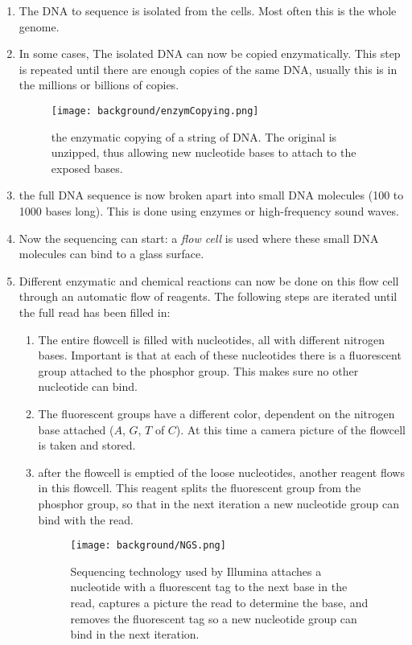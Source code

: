 \begin{enumerate}
	\item The DNA to sequence is isolated from the cells. Most often this is the whole genome.
	\item  In some cases, The isolated DNA can now be copied enzymatically. This step is repeated until there are enough copies of the same DNA, usually this is in the millions or billions of copies.
	
	\begin{figure}[H]
		\centering
		\texttt{[image: background/enzymCopying.png]}
		\caption{the enzymatic copying of a string of DNA. The original is unzipped, thus allowing new nucleotide bases to attach to the exposed bases.}
		\label{fig:enzymCopying}
	\end{figure}
	
	\item the full DNA sequence is now broken apart into small DNA molecules (100 to 1000 bases long). This is done using enzymes or high-frequency sound waves.
	\item Now the sequencing can start: a \emph{flow cell} is used where these small DNA molecules can bind to a glass surface. 
	\item Different enzymatic and chemical reactions can now be done on this flow cell through an automatic flow of reagents. The following steps are iterated until the full read has been filled in:
	\begin{enumerate}
		\item The entire flowcell is filled with nucleotides, all with different nitrogen bases. Important is that at each of these nucleotides there is a fluorescent group attached to the phosphor group. This makes sure no other nucleotide can bind.
		\item The fluorescent groups have a different color, dependent on the nitrogen base attached ($A$, $G$, $T$ of $C$). At this time a camera picture of the flowcell is taken and stored.
		\item after the flowcell is emptied of the loose nucleotides, another reagent flows in this flowcell. This reagent splits the fluorescent group from the phosphor group, so that in the next iteration a new nucleotide group can bind with the read.
		
		\begin{figure}[H]
			\centering
			\texttt{[image: background/NGS.png]}
			\caption{Sequencing technology used by Illumina attaches a nucleotide with a fluorescent tag to the next base in the read, captures a picture the read to determine the base, and removes the fluorescent tag so a new nucleotide group can bind in the next iteration.}
			\label{fig:NGS}
		\end{figure}
	\end{enumerate}
	

\end{enumerate}
